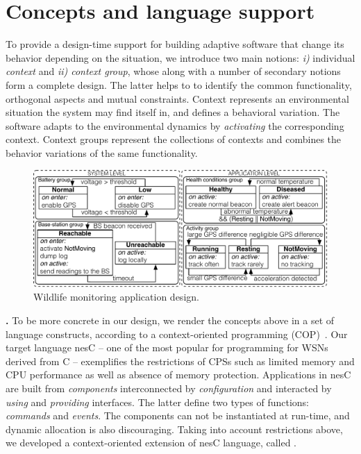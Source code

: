 \section{Concepts and language support}

To provide a design-time support for building adaptive software that change its
behavior depending on the situation, we introduce two main notions:
\emph{i)} individual \emph{context} and \emph{ii) context group}, whose along
with a number of secondary notions form a complete design. The latter helps to
to identify the common functionality, orthogonal aspects and mutual constraints.
Context represents an environmental situation the system may find itself in, and
defines a behavioral variation. The software adapts to the
environmental dynamics by \emph{activating} the corresponding context. Context
groups represent the collections of contexts and combines the behavior
variations of the same functionality.

\begin{figure}
\begin{center}
\includegraphics[scale=.45]{imgs/wildlifetracking}
\vspace{-1mm}
\caption{Wildlife monitoring application design.}
  \label{fig:design}
\vspace{-9mm}
\end{center}
\end{figure}

{\bf \conesc.} To be more concrete in our design, we render the concepts above in
a set of language constructs, according to a context-oriented programming
(COP)~\cite{Hirschfeld08}. Our target language nesC -- one of the most popular
for programming for WSNs derived from C -- exemplifies the restrictions of CPSs
such as limited memory and CPU performance as well as absence of memory
protection. Applications in nesC are built from \emph{components} interconnected
by \emph{configuration} and interacted by \emph{using} and \emph{providing}
interfaces. The latter define two types of functions: \emph{commands} and
\emph{events}. The components can not be instantiated at run-time, and dynamic
allocation is also discouraging. Taking into account restrictions above, we
developed a context-oriented extension of nesC language, called \conesc.

